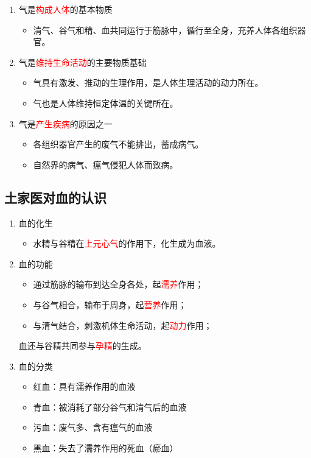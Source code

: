 \documentclass[cn,hazy,blue,12pt,normal,founder]{elegantnote}
\newcommand{\redt}[1]{\textcolor{red}{{}#1}}      %
\begin{document}
\begin{enumerate}
  \item 气是\redt{构成人体}的基本物质
  \begin{itemize}
    \item 清气、谷气和精、血共同运行于筋脉中，循行至全身，充养人体各组织器官。
  \end{itemize}
  \item 气是\redt{维持生命活动}的主要物质基础
  \begin{itemize}
    \item 气具有激发、推动的生理作用，是人体生理活动的动力所在。
    \item 气也是人体维持恒定体温的关键所在。
  \end{itemize}
  \item 气是\redt{产生疾病}的原因之一
  \begin{itemize}
    \item 各组织器官产生的废气不能排出，蓄成病气。
    \item 自然界的病气、瘟气侵犯人体而致病。
  \end{itemize}
\end{enumerate}

\subsection{土家医对血的认识}

\begin{enumerate}
  \item 血的化生
  \begin{itemize}
    \item 水精与谷精在\redt{上元心气}的作用下，化生成为血液。
  \end{itemize}
  \item 血的功能
  \begin{itemize}
    \item 通过筋脉的输布到达全身各处，起\redt{濡养}作用；
    \item 与谷气相合，输布于周身，起\redt{营养}作用；
    \item 与清气结合，刺激机体生命活动，起\redt{动力}作用；
  \end{itemize}
  \begin{note}
    血还与谷精共同参与\redt{孕精}的生成。
  \end{note}
  \item 血的分类
  \begin{itemize}
    \item 红血：具有濡养作用的血液
    \item 青血：被消耗了部分谷气和清气后的血液
    \item 污血：废气多、含有瘟气的血液
    \item 黑血：失去了濡养作用的死血（瘀血）
  \end{itemize}
\end{enumerate}
\end{document}
